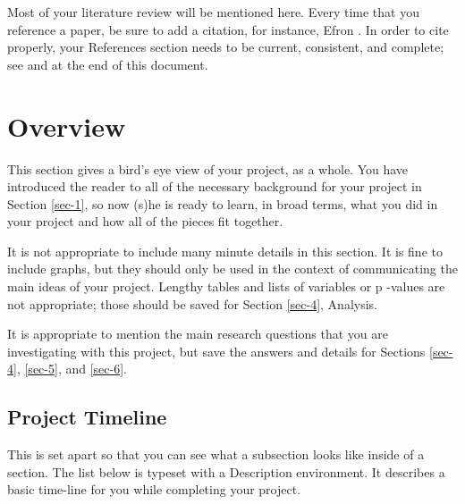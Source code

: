 \documentclass[11pt]{article}
\begin{document}
Most of your literature review will be mentioned here. Every time that
you reference a paper, be sure to add a citation, for instance, Efron
\cite{Efron1972}. In order to cite properly, your References section
needs to be current, consistent, and complete; see \cite{Cons} and
\cite{NoCopy} at the end of this document.

\newpage

\section[Overview]{Overview}
\label{sec-2}

This section gives a bird's eye view of your project, as a whole.  You
have introduced the reader to all of the necessary background for your
project in Section \ref{sec-1}, so now (s)he is ready to learn,
in broad terms, what you did in your project and how all of the pieces
fit together.

It is not appropriate to include many minute details in this
section. It is fine to include graphs, but they should only be used in
the context of communicating the main ideas of your project. Lengthy
tables and lists of variables or p -values are not appropriate; those
should be saved for Section \ref{sec-4}, Analysis.

It is appropriate to mention the main research questions that you are
investigating with this project, but save the answers and details for
Sections \ref{sec-4}, \ref{sec-5}, and \ref{sec-6}.

\subsection[Project Timeline]{Project Timeline}
\label{sec-2-1}

This is set apart so that you can see what a subsection looks like
inside of a section. The list below is typeset with a Description
environment. It describes a basic time-line for you while completing
your project.
\end{document}
